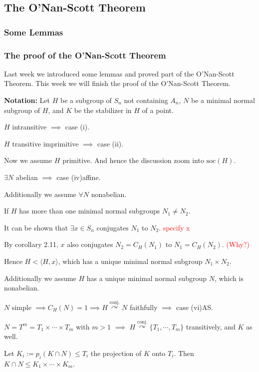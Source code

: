 \documentclass[a4paper,11pt]{article}
\def\maintitle#1{\section*{#1}}
\def\subtitle#1{\section{#1}}
\begin{document}
\else %
    \def\maintitle#1{\subsection{#1}}
    \def\subtitle#1{\subsubsection{#1}}
\fi


\maintitle{The O'Nan-Scott Theorem}
\subtitle{Some Lemmas}
\subtitle{The proof of the O'Nan-Scott Theorem}

Last week we introduced some lemmas and proved part of the O'Nan-Scott Theorem. This week we will finish the proof of the O'Nan-Scott Theorem.

\noindent\textbf{Notation:} Let $H$ be a subgroup of $S_n$ not containing $A_n$, $N$ be a minimal normal subgroup of $H$, and $K$ be the stabilizer in $H$ of a point.

$H$ intransitive $\implies$ case (i).

$H$ transitive imprimitive $\implies$ case (ii).

\noindent Now we assume $H$ primitive. And hence the discussion zoom into $\mathrm{soc}(H)$.

$\exists N$ abelian $\implies$ case (iv)affine.

\noindent Additionally we assume $\forall N$ nonabelian. 

If $H$ has more than one minimal normal subgroups $N_1\neq N_2$. 

It can be shown that $\exists x\in S_n$ conjugates $N_1$ to $N_2$. \textcolor{red}{specify x}

By corollary 2.11, $x$ also conjugates $N_2=C_H(N_1)$ to $N_1=C_H(N_2)$. \textcolor{red}{(Why?)} 

Hence $H<\langle H,x\rangle$, which has a unique minimal normal subgroup $N_1\times N_2$.

\noindent Additionally we assume $H$ has a unique minimal normal subgroup $N$, which is nonabelian.

$N$ simple $\implies C_H(N)=1\implies H\mathop{\curvearrowright}\limits^{\text{conj.}} N$ faithfully $\implies$ case (vi)AS.

$N=T^m=T_1\times\cdots\times T_m$ with $m>1$ $\implies$ $H\mathop{\curvearrowright}\limits^{\text{conj.}} \{T_1,\cdots,T_m\}$ transitively, and $K$ as well.

Let $K_i:=p_i(K\cap N)\leq T_i$ the projection of $K$ onto $T_i$. Then $K\cap N\leq K_1\times\cdots\times K_m$.
\end{document}
